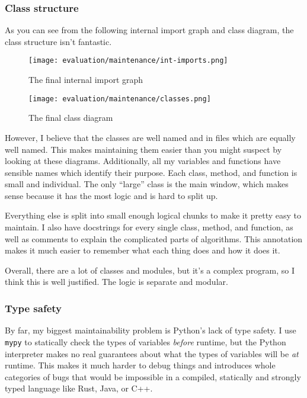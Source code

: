 \documentclass[../main.tex]{subfiles}
\begin{document}
\subsubsection{Class structure\label{evaluation:maintenance:class-structure}}

As you can see from the following internal import graph and class diagram, the class structure isn't fantastic.

\begin{figure}[H]
	\centering
	\texttt{[image: evaluation/maintenance/int-imports.png]}
	\caption{The final internal import graph}
	\label{fig:evaluation:maintenance:int-imports.png}
\end{figure}
\begin{figure}[H]
	\centering
	\texttt{[image: evaluation/maintenance/classes.png]}
	\caption{The final class diagram}
	\label{fig:evaluation:maintenance:classes.png}
\end{figure}

However, I believe that the classes are well named and in files which are equally well named. This makes maintaining them easier than you might suspect by looking at these diagrams. Additionally, all my variables and functions have sensible names which identify their purpose. Each class, method, and function is small and individual. The only \enquote{large} class is the main window, which makes sense because it has the most logic and is hard to split up.

Everything else is split into small enough logical chunks to make it pretty easy to maintain. I also have docstrings for every single class, method, and function, as well as comments to explain the complicated parts of algorithms. This annotation makes it much easier to remember what each thing does and how it does it.

Overall, there are a lot of classes and modules, but it's a complex program, so I think this is well justified. The logic is separate and modular.

\subsubsection{Type safety\label{evaluation:maintenance:type-safety}}

By far, my biggest maintainability problem is Python's lack of type safety. I use \texttt{mypy} to statically check the types of variables \textit{before} runtime, but the Python interpreter makes no real guarantees about what the types of variables will be \textit{at} runtime. This makes it much harder to debug things and introduces whole categories of bugs that would be impossible in a compiled, statically and strongly typed language like Rust, Java, or C++.
\end{document}

